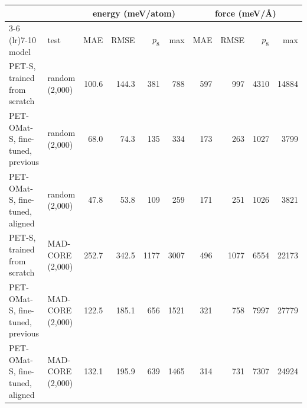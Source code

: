 \begin{tabular}{l l rrrr rrrr}
\toprule
 & & \multicolumn{4}{c}{energy (meV/atom)} & \multicolumn{4}{c}{force (meV/\AA{})} \\
\cmidrule(lr){3-6} \cmidrule(lr){7-10}
model & test & MAE & RMSE & $p_8$ & max & MAE & RMSE & $p_8$ & max \\
\midrule
PET-S, trained from scratch & random (2,000) & 100.6 & 144.3 & 381 & 788 & 597 & 997 & 4310 & 14884 \\
PET-OMat-S, fine-tuned, previous & random (2,000) & 68.0 & 74.3 & 135 & 334 & 173 & 263 & 1027 & 3799 \\
PET-OMat-S, fine-tuned, aligned & random (2,000) & 47.8 & 53.8 & 109 & 259 & 171 & 251 & 1026 & 3821 \\
\midrule
PET-S, trained from scratch & MAD-CORE (2,000) & 252.7 & 342.5 & 1177 & 3007 & 496 & 1077 & 6554 & 22173 \\
PET-OMat-S, fine-tuned, previous & MAD-CORE (2,000) & 122.5 & 185.1 & 656 & 1521 & 321 & 758 & 7997 & 27779 \\
PET-OMat-S, fine-tuned, aligned & MAD-CORE (2,000) & 132.1 & 195.9 & 639 & 1465 & 314 & 731 & 7307 & 24924 \\
\bottomrule
\end{tabular}
